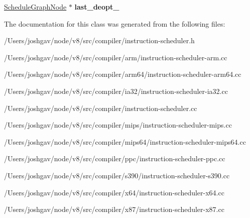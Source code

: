 \begin{DoxyCompactItemize}
\item 
\hyperlink{classv8_1_1internal_1_1compiler_1_1_instruction_scheduler_1_1_schedule_graph_node}{Schedule\+Graph\+Node} $\ast$ {\bfseries last\+\_\+deopt\+\_\+}\hypertarget{classv8_1_1internal_1_1compiler_1_1_instruction_scheduler_a803b0d1ec274f0a8e65261c6060d8597}{}\label{classv8_1_1internal_1_1compiler_1_1_instruction_scheduler_a803b0d1ec274f0a8e65261c6060d8597}

\end{DoxyCompactItemize}


The documentation for this class was generated from the following files\+:\begin{DoxyCompactItemize}
\item 
/\+Users/joshgav/node/v8/src/compiler/instruction-\/scheduler.\+h\item 
/\+Users/joshgav/node/v8/src/compiler/arm/instruction-\/scheduler-\/arm.\+cc\item 
/\+Users/joshgav/node/v8/src/compiler/arm64/instruction-\/scheduler-\/arm64.\+cc\item 
/\+Users/joshgav/node/v8/src/compiler/ia32/instruction-\/scheduler-\/ia32.\+cc\item 
/\+Users/joshgav/node/v8/src/compiler/instruction-\/scheduler.\+cc\item 
/\+Users/joshgav/node/v8/src/compiler/mips/instruction-\/scheduler-\/mips.\+cc\item 
/\+Users/joshgav/node/v8/src/compiler/mips64/instruction-\/scheduler-\/mips64.\+cc\item 
/\+Users/joshgav/node/v8/src/compiler/ppc/instruction-\/scheduler-\/ppc.\+cc\item 
/\+Users/joshgav/node/v8/src/compiler/s390/instruction-\/scheduler-\/s390.\+cc\item 
/\+Users/joshgav/node/v8/src/compiler/x64/instruction-\/scheduler-\/x64.\+cc\item 
/\+Users/joshgav/node/v8/src/compiler/x87/instruction-\/scheduler-\/x87.\+cc\end{DoxyCompactItemize}
